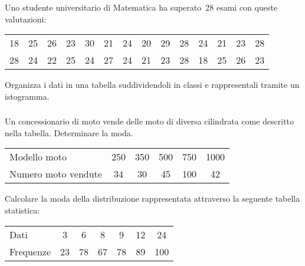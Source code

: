 \begin{esercizio}
\label{ese:A.20}
Uno studente universitario di Matematica ha superato~28 esami con queste 
valutazioni:
\begin{center}
 \begin{tabular}{cccccccccccccc}
18 & 25 & 26 & 23 & 30 & 21 & 24 & 20 & 29 & 28 & 24 & 21 & 23 & 28\\
28 & 24 & 22 & 25 & 24 & 27 & 24 & 21 & 23 & 28 & 18 & 25 & 26 & 23\\
 \end{tabular}
\end{center}
Organizza i dati in una tabella suddividendoli in classi e rappresentali 
tramite un istogramma.
\end{esercizio}

\subsubsection*{}

\begin{esercizio}
\label{ese:A.21}
Un concessionario di moto vende delle moto di diversa cilindrata come 
descritto nella tabella.
Determinare la moda.
\begin{center}
\begin{tabular}{l*{5}{c}}
\toprule
Modello moto & 250 &350 &500 &750 &1000\\
Numero moto vendute & 34 & 30 & 45 & 100 & 42 \\
\bottomrule
\end{tabular}
\end{center}
\end{esercizio}

\begin{esercizio}
\label{ese:A.22}
Calcolare la moda della distribuzione rappresentata attraverso la seguente 
tabella statistica:
\begin{center}
 \begin{tabular}{l*{6}{c}}
\toprule
Dati & 3 & 6 & 8 & 9 & 12 & 24 \\
Frequenze & 23 & 78 & 67 & 78 & 89 & 100 \\
\bottomrule
\end{tabular}
\end{center}
\end{esercizio}

